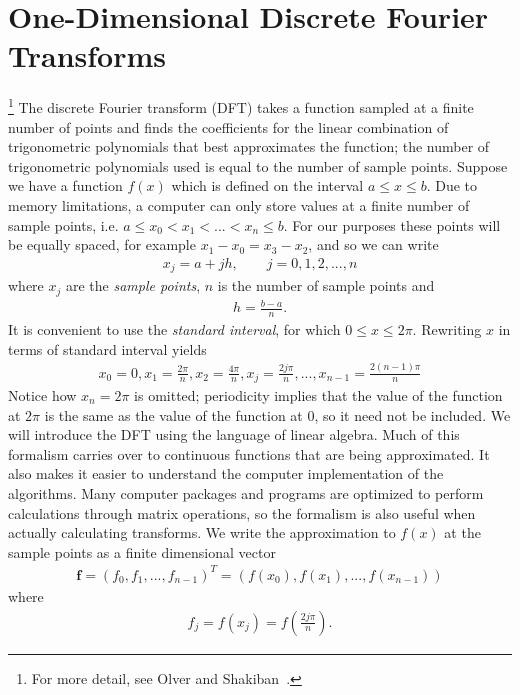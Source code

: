\chapter{One-Dimensional Discrete Fourier Transforms}
\footnote{For more detail, see Olver and Shakiban~\cite{OlvSha06}.} The discrete Fourier transform (DFT) takes a function sampled at a finite number of points and finds the coefficients for the linear combination of trigonometric polynomials that best approximates the function; the number of trigonometric polynomials used is equal to the number of sample points.  Suppose we have a function $f(x)$ which is defined on the interval $a \leq x \leq b$. Due to memory limitations, a computer can only store values at a finite number of sample points, i.e. $a \leq x_0 < x_1 < ... <x_n \leq b$. For our purposes these points will be equally spaced, for example $x_1-x_0=x_3-x_2$, and so we can write
\begin{eqnarray}
x_j = a +jh, \qquad j=0,1,2,...,n
\end{eqnarray}
where $x_j$ are the \emph{sample points}, $n$ is the number of sample points and
\begin{eqnarray}
 h=\frac{b-a}{n}.
\end{eqnarray}
It is convenient to use the \emph{standard interval}, for which $0 \leq x \leq 2\pi$. Rewriting $x$ in terms of standard interval yields
\begin{eqnarray}
x_0=0,x_1=\frac{2\pi}{n},x_2=\frac{4\pi}{n},x_j=\frac{2j\pi}{n},...,x_{n-1}=\frac{2(n-1) \pi}{n}
\end{eqnarray}
Notice how $x_n=2\pi$ is omitted;  periodicity implies that the value of the function at $2\pi$ is the same as the value of the function at $0$, so it need not be included. We will introduce the DFT using the language of linear algebra. Much of this formalism carries over to continuous functions that are being approximated. It also makes it easier to understand the computer implementation of the algorithms. Many computer packages and programs are optimized to perform calculations through matrix operations, so the formalism is also useful when actually calculating transforms. We write the approximation to $f(x)$ at the sample points as a finite dimensional vector
\begin{eqnarray}
\bm{f}=(f_0,f_1,...,f_{n-1})^{T}=(f(x_0),f(x_1), ... ,f(x_{n-1}))
\end{eqnarray}
where
\begin{eqnarray}
 f_j=f(x_j)=f \left(\frac{2 j \pi}{n} \right).
\end{eqnarray}
